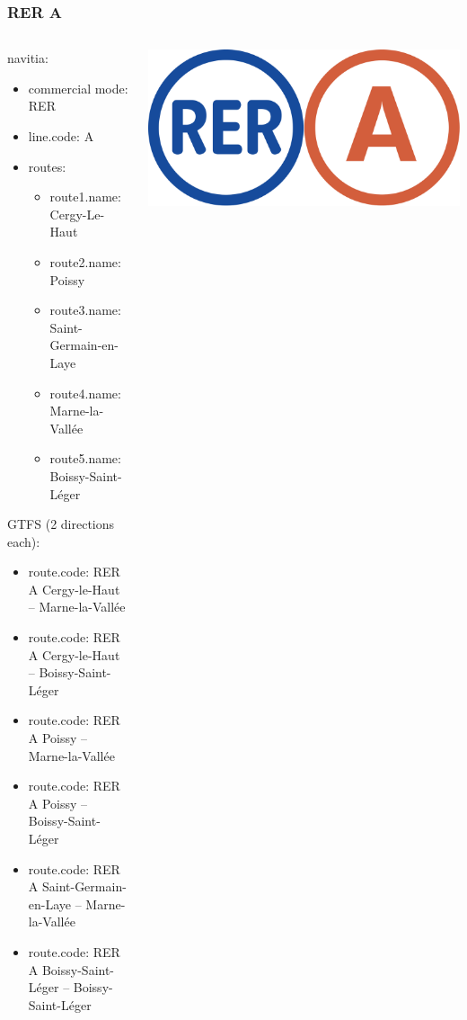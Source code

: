\documentclass[table]{beamer}
\begin{document}
\begin{frame}
  \frametitle{RER A}
  
  \begin{columns}
    \begin{column}{0.7\linewidth}
      \scriptsize

      navitia:
      \begin{itemize}
      \item commercial mode: RER
      \item line.code: A
      \item routes:
        \begin{itemize}
          \scriptsize
        \item route1.name: Cergy-Le-Haut
        \item route2.name: Poissy
        \item route3.name: Saint-Germain-en-Laye
        \item route4.name: Marne-la-Vallée
        \item route5.name: Boissy-Saint-Léger
        \end{itemize}
      \end{itemize}

      GTFS (2 directions each):
      \begin{itemize}
      \item route.code: RER A Cergy-le-Haut -- Marne-la-Vallée
      \item route.code: RER A Cergy-le-Haut -- Boissy-Saint-Léger
      \item route.code: RER A Poissy -- Marne-la-Vallée
      \item route.code: RER A Poissy -- Boissy-Saint-Léger
      \item route.code: RER A Saint-Germain-en-Laye -- Marne-la-Vallée
      \item route.code: RER A Boissy-Saint-Léger -- Boissy-Saint-Léger
      \end{itemize}
    \end{column}
    \begin{column}{0.3\linewidth}
      \centering
      \includegraphics[width=0.5\linewidth]{images/rer-a-logo}


\end{column}
\end{columns}
\end{frame}
\end{document}
